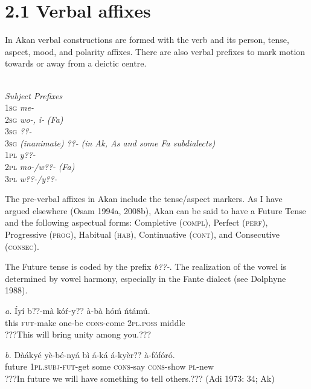 \documentclass[output=paper]{langsci/langscibook}
\begin{document}
\section{2.1  Verbal affixes}

In Akan verbal constructions are  formed with the verb and its person, tense, aspect, mood, and polarity affixes. There are also verbal prefixes to mark motion towards or away from a deictic centre.


\ea
{}\\

     \emph{        }\emph{\textup{Subject }}\emph{\textup{Prefixes}}\\
     \textsc{1sg  }\emph{ }\emph{me-}\\
     \textsc{2sg  }\emph{      wo-, i- }\emph{\textup{(Fa)}}\\
     \textsc{3sg  }\emph{      ??{}-}\\
     \textsc{3sg}\emph{\textup{ (inanimate)}}\emph{    ??{}- }\emph{\textup{(in Ak, As and some Fa subdialects)}}\\
     \textsc{1pl  }\emph{      y??-}\\
     \textsc{2pl  }\emph{      mo-/w??- }\emph{\textup{(Fa)}}\emph{  }\\
     \textsc{3pl  }\emph{      w??-/y??-}\\
     \z
     
The pre-verbal affixes in Akan include the tense/aspect markers. As I have argued elsewhere (Osam 1994a, 2008b), Akan can be said to have a Future Tense and the following aspectual forms: Completive (\textsc{compl}), Perfect (\textsc{perf}), Progressive (\textsc{prog}), Habitual (\textsc{hab}), Continuative (\textsc{cont}), and Consecutive (\textsc{consec}).

The Future tense is coded by the prefix \emph{b??-}. The realization of the vowel is determined by vowel harmony, especially in the Fante dialect (see Dolphyne 1988).

\ea
\gll \emph{a.}  \'{I}yí  b??-mà    kó\'{r}-y??    à-bà    hóḿ    ńtámú.\\
       this  \textsc{fut}{}-make  one-be    \textsc{cons}{}-come  \textsc{2pl.poss}  middle\\
\glt ???This will bring unity among you.??? \citep[79]{Krampah1970}
\z

\ea
\gll \emph{b.  }Dàákyé yè-bé-nyá    bì  á-ká    á-kyèr??    à-fófóró.  \\
       future   \textsc{1pl.subj}{}-\textsc{fut}{}-get  some  \textsc{cons}{}-say\textsc{   cons}{}-show  \textsc{pl}{}-new\\
\glt    ???In future we will have something to tell others.??? (Adi 1973: 34; Ak)
\z
\end{document}
